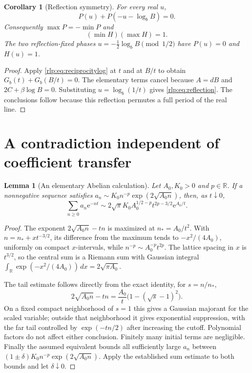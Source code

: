 \documentclass[11pt,letterpaper]{article}
\numberwithin{equation}{section}
\newtheorem{lemma}[theorem]{Lemma}
\newtheorem{corollary}[theorem]{Corollary}
\theoremstyle{remark}\newtheorem{remark}[theorem]{Remark}
\newcommand{\ee}{\mathrm e}
\newcommand{\R}{\mathbb R}
\begin{document}
\begin{corollary}[Reflection symmetry]\label{rlp:cor:reflection}
For every real $u$,
\begin{equation}\label{rlp:eq:reflection}
 P(u)+P(-u-\log_bB)=0.
\end{equation}
Consequently $\max P=-\min P$ and
\begin{equation}\label{rlp:eq:reciprocalendpoints}
 (\min H)(\max H)=1.
\end{equation}
The two reflection-fixed phases $u=-\tfrac12\log_bB\pmod{1/2}$ have $P(u)=0$ and $H(u)=1$.
\end{corollary}
\begin{proof}
Apply \eqref{rlp:eq:reciprocitylog} at $t$ and at $B/t$ to obtain
$G_b(t)+G_b(B/t)=0$. The elementary terms cancel because $A=dB$ and $2C+\beta\log B=0$. Substituting $u=\log_b(1/t)$ gives \eqref{rlp:eq:reflection}. The conclusions follow because this reflection permutes a full period of the real line.
\end{proof}

\section{A contradiction independent of coefficient transfer}
\label{rlp:sec:abelian}
\begin{lemma}[An elementary Abelian calculation]\label{rlp:lem:abelian}
Let $A_0,K_0>0$ and $p\in\R$. If a nonnegative sequence satisfies
$a_n\sim K_0 n^{-p}\exp(2\sqrt{A_0n})$, then, as $t\downarrow0$,
\begin{equation}\label{rlp:eq:abelian}
 \sum_{n\ge0}a_n\ee^{-nt}\sim
 2\sqrt\pi K_0 A_0^{1/2-p}
 t^{2p-3/2}\ee^{A_0/t}.
\end{equation}
\end{lemma}
\begin{proof}
The exponent $2\sqrt{A_0n}-tn$ is maximized at $n_*=A_0/t^2$. With
$n=n_*+x t^{-3/2}$, its difference from the maximum tends to
$-x^2/(4A_0)$, uniformly on compact $x$-intervals, while
$n^{-p}\sim A_0^{-p}t^{2p}$. The lattice spacing in $x$ is $t^{3/2}$, so the central sum is a Riemann sum with Gaussian integral
$\int_\R\exp(-x^2/(4A_0))\,dx=2\sqrt{\pi A_0}$.

The tail estimate follows directly from the exact identity, for $s=n/n_*$,
\[
 2\sqrt{A_0n}-tn=\frac{A_0}{t}\bigl(1-(\sqrt s-1)^2\bigr).
\]
On a fixed compact neighborhood of $s=1$ this gives a Gaussian majorant for the scaled variable; outside that neighborhood it gives exponential suppression, with the far tail controlled by $\exp(-tn/2)$ after increasing the cutoff. Polynomial factors do not affect either conclusion. Finitely many initial terms are negligible. Finally the assumed equivalent bounds all sufficiently large $a_n$ between $(1\pm\delta)K_0n^{-p}\exp(2\sqrt{A_0n})$. Apply the established sum estimate to both bounds and let $\delta\downarrow0$.
\end{proof}
\end{document}
